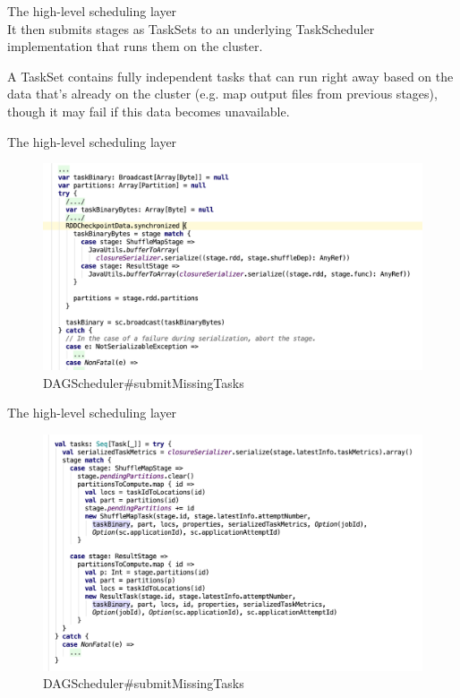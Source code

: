 \begin{frame}[plain,t]{The high-level scheduling layer} %
	 \\  \vspace{2ex}
	It then submits stages as TaskSets to an underlying TaskScheduler implementation that runs them on the cluster.
	
	\vspace{2ex}
	
	A TaskSet contains fully independent tasks that can run right away based on the data that's already on the cluster
	 (e.g. map output files from previous stages), though it may fail if this data becomes unavailable.
	
\end{frame}
\begin{frame}[plain,t]{The high-level scheduling layer} %
	 \\  
	
	\begin{figure}
		\centering
		\includegraphics[width=0.9\linewidth]{images/dag004}
		\caption{DAGScheduler\#submitMissingTasks}
		\label{fig:dag004}
	\end{figure}
\end{frame}
\begin{frame}[plain,t]{The high-level scheduling layer} %
	 \\  
	
	\begin{figure}
		\centering
		\includegraphics[width=0.9\linewidth]{images/dag012}
		\caption{DAGScheduler\#submitMissingTasks}
		\label{fig:dag012}
	\end{figure}
	
\end{frame}

